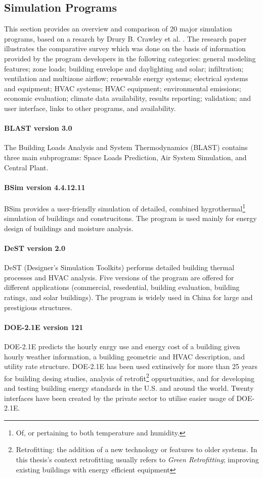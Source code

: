 \newpage
\subsection{Simulation Programs}

This section provides an overview and comparison of 20 major simulation programs, based on a resarch by Drury B. Crawley et al. \cite{crawley05}. The research paper illustrates the comparative survey which was done on the basis of information provided by the program developers in the following categories: general modeling features; zone loads; building envelope and daylighting and solar; infiltration; ventilation and multizone airflow; renewable energy systems; electrical systems and equipment; HVAC systems; HVAC equipment; environmental emissions; economic evaluation; climate data availability, results reporting; validation; and user interface, links to other programs, and availability.

\paragraph{BLAST version 3.0} The Building Loads Analysis and System Thermodynamics (BLAST) contains three main subprograms: Space Loads Prediction, Air System Simulation, and Central Plant.

\paragraph{BSim version 4.4.12.11} BSim provides a user-friendly simulation of detailed, combined hygrothermal\footnote{Of, or pertaining to both temperature and humidity.} simulation of buildings and construcitons. The program is used mainly for energy design of buildings and moisture analysis.

\paragraph{DeST version 2.0} DeST (Designer's Simulation Toolkits) performs detailed building thermal processes and HVAC analysis. Five versions of the program are offered for different applications (commercial, resedential, building evaluation, building ratings, and solar buildings). The program is widely used in China for large and prestigious structures.

\paragraph{DOE-2.1E version 121} DOE-2.1E predicts the hourly enrgy use and energy cost of a building given hourly weather information, a building geometric and HVAC description, and utility rate structure. DOE-2.1E has been used extinsively for more than 25 years for building desing studies, analysis of retrofit\footnote{Retrofitting: the addition of a new technology or features to older systems. In this thesis's context retrofitting usually refers to \emph{Green Retrofitting}; improving existing buildings with energy efficient equipment} oppurtunities, and for developing and testing building energy standards in the U.S. and around the world. Twenty interfaces have been created by the private sector to utilise easier usage of DOE-2.1E. \label{par:DOE}

